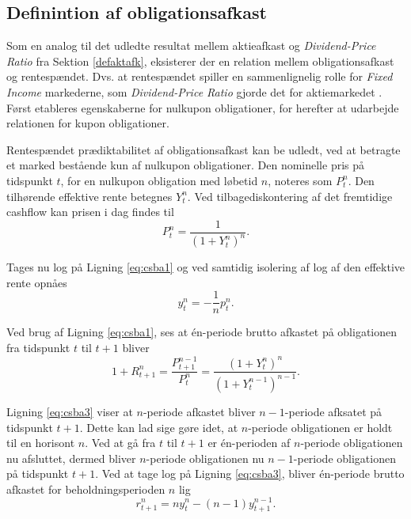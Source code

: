 \documentclass[
  a4paper,
  oneside]{memoir}
\begin{document}
\hypertarget{definintion-af-obligationsafkast}{%
\subsection{Definintion af obligationsafkast}\label{definintion-af-obligationsafkast}}

Som en analog til det udledte resultat mellem aktieafkast og \emph{Dividend-Price Ratio} fra Sektion \ref{defaktafk}, eksisterer der en relation mellem obligationsafkast og rentespændet. Dvs. at rentespændet spiller en sammenlignelig rolle for \emph{Fixed Income} markederne, som \emph{Dividend-Price Ratio} gjorde det for aktiemarkedet \citep{Campbell1997}. Først etableres egenskaberne for nulkupon obligationer, for herefter at udarbejde relationen for kupon obligationer.

Rentespændet prædiktabilitet af obligationsafkast kan be udledt, ved at betragte et marked bestående kun af nulkupon obligationer. Den nominelle pris på tidspunkt \(t\), for en nulkupon obligation med løbetid \(n\), noteres som \(P_t^n\). Den tilhørende effektive rente betegnes \(Y_t^n\). Ved tilbagediskontering af det fremtidige cashflow kan prisen i dag findes til
\begin{equation}
P_t^n=\frac{1}{(1+Y_t^n)^n}. \label{eq:csba1}
\end{equation}

Tages nu log på Ligning \eqref{eq:csba1} og ved samtidig isolering af log af den effektive rente opnåes
\begin{equation}
y_t^n=-\frac{1}{n}p_t^n. \label{eq:csba2}
\end{equation}

Ved brug af Ligning \eqref{eq:csba1}, ses at én-periode brutto afkastet på obligationen fra tidspunkt \(t\) til \(t+1\) bliver
\begin{equation}
1+R_{t+1}^n=\frac{P_{t+1}^{n-1}}{P_t^n}=\frac{(1+Y_t^n)^n}{(1+Y_t^{n-1})^{n-1}}. \label{eq:csba3}
\end{equation}

Ligning \eqref{eq:csba3} viser at \(n\)-periode afkastet bliver \(n-1\)-periode afksatet på tidspunkt \(t+1\). Dette kan lad sige gøre idet, at \(n\)-periode obligationen er holdt til en horisont \(n\). Ved at gå fra \(t\) til \(t+1\) er én-perioden af \(n\)-periode obligationen nu afsluttet, dermed bliver \(n\)-periode obligationen nu \(n-1\)-periode obligationen på tidspunkt \(t+1\). Ved at tage log på Ligning \eqref{eq:csba3}, bliver én-periode brutto afkastet for beholdningsperioden \(n\) lig
\begin{equation}
r_{t+1}^n=n y_t^n - (n-1) y_{t+1}^{n-1}. \label{eq:csba4}
\end{equation}
\end{document}
